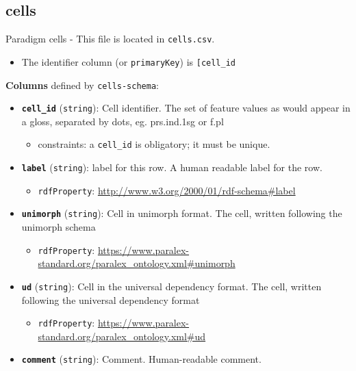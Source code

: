 \hypertarget{cells}{%
\subsection{\texorpdfstring{\textbf{cells}}{cells}}\label{cells}}

Paradigm cells - This file is located in \texttt{cells.csv}.

\begin{itemize}
\tightlist
\item
  The identifier column (or \texttt{primaryKey}) is
  \texttt{{[}\textquotesingle{}cell\_id\textquotesingle{}{]}}
\end{itemize}

\textbf{Columns} defined by \texttt{cells-schema}:

\begin{itemize}
\item
  \textbf{\texttt{cell\_id}} (\texttt{string}): Cell identifier. The set
  of feature values as would appear in a gloss, separated by dots, eg.
  prs.ind.1sg or f.pl

  \begin{itemize}
  \tightlist
  \item
    constraints: a \texttt{cell\_id} is obligatory; it must be unique.
  \end{itemize}
\item
  \textbf{\texttt{label}} (\texttt{string}): label for this row. A human
  readable label for the row.

  \begin{itemize}
  \tightlist
  \item
    \texttt{rdfProperty}:
    \url{http://www.w3.org/2000/01/rdf-schema\#label}
  \end{itemize}
\item
  \textbf{\texttt{unimorph}} (\texttt{string}): Cell in unimorph format.
  The cell, written following the unimorph schema

  \begin{itemize}
  \tightlist
  \item
    \texttt{rdfProperty}:
    \url{https://www.paralex-standard.org/paralex_ontology.xml\#unimorph}
  \end{itemize}
\item
  \textbf{\texttt{ud}} (\texttt{string}): Cell in the universal
  dependency format. The cell, written following the universal
  dependency format

  \begin{itemize}
  \tightlist
  \item
    \texttt{rdfProperty}:
    \url{https://www.paralex-standard.org/paralex_ontology.xml\#ud}
  \end{itemize}
\item
  \textbf{\texttt{comment}} (\texttt{string}): Comment. Human-readable
  comment.


\end{itemize}
